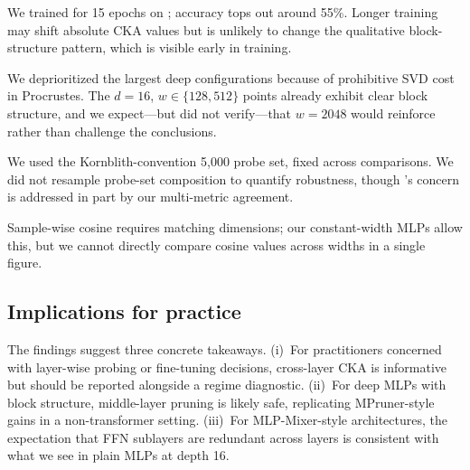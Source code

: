  We trained for 15 epochs on \cifar; accuracy tops out around 55\%. Longer training may shift absolute CKA values but is unlikely to change the qualitative block-structure pattern, which is visible early in training.

 We deprioritized the largest deep configurations because of prohibitive SVD cost in Procrustes. The $d\!=\!16$, $w\!\in\!\{128, 512\}$ points already exhibit clear block structure, and we expect---but did not verify---that $w\!=\!2048$ would reinforce rather than challenge the conclusions.

 We used the Kornblith-convention 5{,}000 probe set, fixed across comparisons. We did not resample probe-set composition to quantify robustness, though \citet{davari2022reliability}'s concern is addressed in part by our multi-metric agreement.

 Sample-wise cosine requires matching dimensions; our constant-width MLPs allow this, but we cannot directly compare cosine values across widths in a single figure.

\subsection{Implications for practice}

The findings suggest three concrete takeaways. (i)~For practitioners concerned with layer-wise probing or fine-tuning decisions, cross-layer CKA is informative but should be reported alongside a regime diagnostic. (ii)~For deep MLPs with block structure, middle-layer pruning is likely safe, replicating MPruner-style gains in a non-transformer setting. (iii)~For MLP-Mixer-style architectures, the expectation that FFN sublayers are redundant across layers is consistent with what we see in plain MLPs at depth 16.
